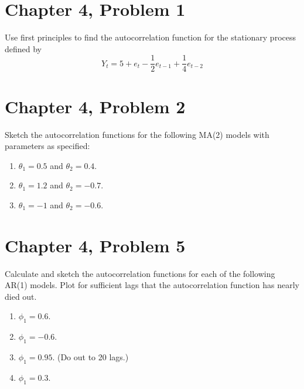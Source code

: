 \documentclass[11pt]{article}
\newif\ifclearpage
\newcommand{\problem}[1]{\section*{#1}}
\newcommand{\solution}{\hrulefill}
\newcommand{\maybeclearpage}{\ifclearpage\clearpage\fi}
\begin{document}
\maybeclearpage
\problem{Chapter 4, Problem 1}
Use first principles to find the autocorrelation function for the stationary process defined by $$ Y_t = 5 + e_t - \frac{1}{2}e_{t-1} + \frac{1}{4}e_{t-2} $$

\solution



\maybeclearpage
\problem{Chapter 4, Problem 2}
Sketch the autocorrelation functions for the following MA(2) models with parameters as specified:
\begin{enumerate}
	\item $\theta_1 = 0.5$ and $\theta_2 = 0.4$.
	\item $\theta_1 = 1.2$ and $\theta_2 = -0.7$.
	\item $\theta_1 = -1$ and $\theta_2 = -0.6$.
\end{enumerate}

\solution

\maybeclearpage
\problem{Chapter 4, Problem 5}
Calculate and sketch the autocorrelation functions for each of the following AR(1) models. Plot for sufficient lags that the autocorrelation function has nearly died out.
\begin{enumerate}
	\item $\phi_1 = 0.6$.
	\item $\phi_1 = -0.6$.
	\item $\phi_1 = 0.95$. (Do out to 20 lags.)
	\item $\phi_1 = 0.3$.
\end{enumerate}

\solution

\maybeclearpage
\end{document}
